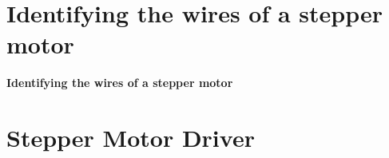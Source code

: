 \documentclass[table,10pt,red]{beamer}	%
\begin{document}
\begin{frame}
	
	

\end{frame}

\section{Identifying the wires of a stepper motor}

\begin{frame}
	\begin{center}
		\textbf{\LARGE Identifying the wires of a stepper motor}
	\end{center}
\end{frame}

\section{Stepper Motor Driver}
\end{document}
